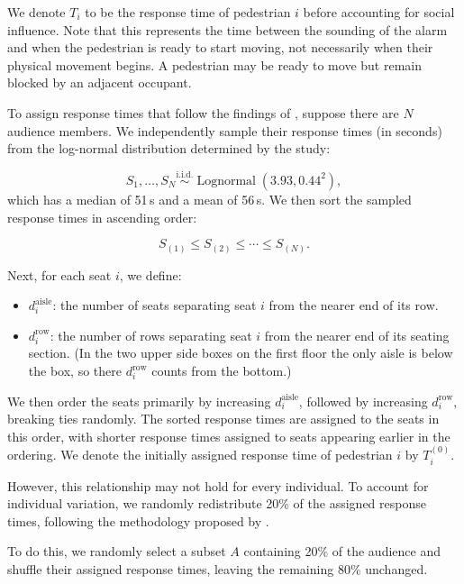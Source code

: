 \documentclass{article}
\begin{document}
We denote $T_i$ to be the response time of pedestrian $i$
before accounting for social influence.
Note that this represents the time between the sounding of
the alarm and when the pedestrian is ready to start moving,
not necessarily when their physical movement begins.
A pedestrian may be ready to move but remain blocked by
an adjacent occupant.

To assign response times that follow the findings of
\cite{galea2017}, suppose there are $N$ audience members.
We independently sample their response times (in seconds) from the
log-normal distribution determined by the study:

\begin{equation}
    S_1, \ldots, S_N \overset{\mathrm{i.i.d.}}{\sim}
    \operatorname{Lognormal}(3.93, 0.44^2),
\end{equation}
which has a median of 51\,s and a mean of 56\,s.
We then sort the sampled response times in ascending order:

\[
    S_{(1)} \leq S_{(2)} \leq \cdots \leq S_{(N)}.
\]

Next, for each seat $i$, we define:
\begin{itemize}
    \item $d_i^{\mathrm{aisle}}$: the number of seats
    separating seat $i$ from the nearer end of its row.

    \item $d_i^{\mathrm{row}}$: the number of rows
    separating seat $i$ from the nearer end of its seating section. (In the two upper side boxes on the first floor the only aisle is below the box, so there $d_i^{\mathrm{row}}$ counts from the bottom.)
\end{itemize}

We then order the seats primarily by increasing
$d_i^{\mathrm{aisle}}$, followed by increasing
$d_i^{\mathrm{row}}$, breaking ties randomly.
The sorted response times are assigned to the seats
in this order, with shorter response times assigned
to seats appearing earlier in the ordering.
We denote the initially assigned response time of
pedestrian $i$ by $T_i^{(0)}$.

However, this relationship may not hold for every individual.
To account for individual variation, we randomly redistribute
20\% of the assigned response times, following the methodology
proposed by \cite{galea2017}.

To do this, we randomly select a subset $A$ containing
20\% of the audience and shuffle their
assigned response times, leaving the remaining 80\% unchanged.
\end{document}
